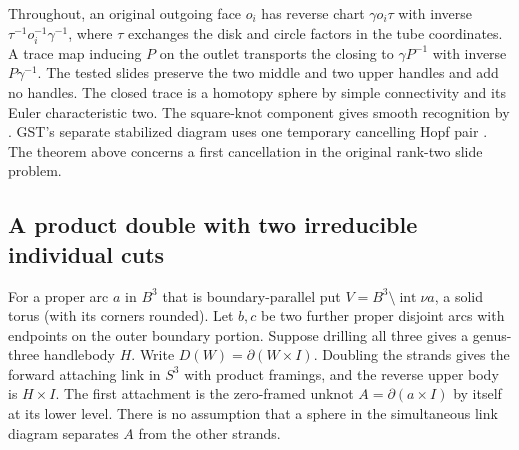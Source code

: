 \documentclass[11pt,letterpaper]{article}
\numberwithin{equation}{section}
\theoremstyle{remark}
\begin{document}
Throughout, an original outgoing face \(o_i\) has reverse chart
\(\gamma o_i\tau\) with inverse \(\tau^{-1}o_i^{-1}\gamma^{-1}\),
where \(\tau\) exchanges the disk and circle factors in the tube
coordinates. A trace map inducing \(P\) on the outlet transports the
closing to \(\gamma P^{-1}\) with inverse \(P\gamma^{-1}\). The
tested slides preserve the two middle and two upper handles and add
no handles. The closed trace is a homotopy sphere by simple
connectivity and its Euler characteristic two. The square-knot
component gives smooth recognition by
\cite[Theorem 1.1]{MeierZupan2022SquareKnots}. GST's separate
stabilized diagram uses one temporary cancelling Hopf pair
\cite[\S10]{GompfScharlemannThompson2010}. The theorem above concerns
a first cancellation in the original rank-two slide problem.

\subsection{A product double with two irreducible individual cuts}\label{sec:double-three}
For a proper arc \(a\) in \(B^3\) that is boundary-parallel put
\(V=B^3\setminus\operatorname{int}\nu a\), a solid torus (with its
corners rounded). Let \(b,c\) be two further proper disjoint arcs with
endpoints on the outer boundary portion. Suppose drilling all three
gives a genus-three handlebody \(H\). Write \(D(W)=\partial(W\times I)\).
Doubling the strands gives the forward attaching link in \(S^3\)
with product framings, and the reverse upper body is \(H\times I\).
The first attachment is the zero-framed unknot \(A=\partial(a\times I)\)
by itself at its lower level. There is no assumption that a sphere in
the simultaneous link diagram separates \(A\) from the other strands.
\end{document}
